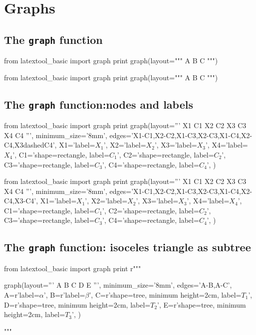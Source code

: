 \section{Graphs}

\subsection{The \texttt{graph} function}

\begin{console}
\begin{python}
from latextool_basic import graph
print graph(layout="""
A
B C
""")
\end{python}
\end{console}

\begin{python}
from latextool_basic import graph
print graph(layout="""
A
B C
""")
\end{python}



\newpage
\subsection{The \texttt{graph} function:nodes and labels}
\begin{console}
\begin{python}
from latextool_basic import graph
print graph(layout='''
     X1  C1
     X2  C2
     X3  C3
     X4  C4
''',
minimum_size='8mm',
edges='X1-C1,X2-C2,X1-C3,X2-C3,X1-C4,X2-C4,X3dashedC4',
X1='label=$X_1$',
X2='label=$X_2$',
X3='label=$X_3$',
X4='label=$X_4$',
C1='shape=rectangle, label=$C_1$',
C2='shape=rectangle, label=$C_2$',
C3='shape=rectangle, label=$C_3$',
C4='shape=rectangle, label=$C_4$',
)
\end{python}
\end{console}

\begin{python}
from latextool_basic import graph
print graph(layout='''
     X1  C1
     X2  C2
     X3  C3
     X4  C4
''',
minimum_size='8mm',
edges='X1-C1,X2-C2,X1-C3,X2-C3,X1-C4,X2-C4,X3-C4',
X1='label=$X_1$',
X2='label=$X_2$',
X3='label=$X_3$',
X4='label=$X_4$',
C1='shape=rectangle, label=$C_1$',
C2='shape=rectangle, label=$C_2$',
C3='shape=rectangle, label=$C_3$',
C4='shape=rectangle, label=$C_4$',
)
\end{python}



\newpage
\subsection{The \texttt{graph} function:
  isoceles triangle as subtree}
\begin{python}
from latextool_basic import graph
print r"""
\begin{console}
graph(layout='''
     A
   B   C
  D E
''',
minimum_size='8mm',
edges='A-B,A-C',
A=r'label=$\alpha$',
B=r'label=$\beta$',
C=r'shape=tree, minimum height=2cm, label=$T_1$',
D=r'shape=tree, minimum height=2cm, label=$T_2$',
E=r'shape=tree, minimum height=2cm, label=$T_3$',
)
\end{console}"""
\end{python}

